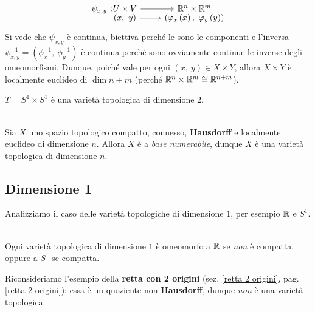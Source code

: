 \begin{demonstration}
\begin{enumerate}[label=\Roman*]
		\begin{equation*}
			\funztot{\psi_{x,y}}{U\times V}{\realset^n\times\realset^m}{\left(x,\ y\right)}{\left(\phi_x\left(x\right),\ \phi_y\left(y\right)\right)}
		\end{equation*}
	Si vede che $\psi_{x,y}$ è continua, biettiva perché le sono le componenti e l'inversa $\psi_{x,y}^{-1}=\left(\phi_x^{-1},\ \phi_y^{-1}\right)$ è continua perché sono ovviamente continue le inverse degli omeomorfismi. Dunque, poiché vale per ogni $\left(x,\ y\right)\in X\times Y$, allora $X\times Y$ è localmente euclideo di $\dim n+m$ (perché $\mathbb{R}^n\times \mathbb{R}^m\cong\mathbb{R}^{n+m}$).
	\end{enumerate}
\vspace{-3mm}
\end{demonstration}
\begin{example}
	$T=S^1\times S^1$ è una varietà topologica di dimensione $2$.
\end{example}
\begin{theorema}~{}\label{compattoconnessohausdorfflocalmenteuclideo}\\
Sia $X$ uno spazio topologico compatto, connesso, \textbf{Hausdorff} e localmente euclideo di dimensione $n$. Allora $X$ è a \textit{base numerabile}, dunque $X$ è una varietà topologica di dimensione $n$.
\end{theorema}
\subsection{Dimensione 1}
Analizziamo il caso delle varietà topologiche di dimensione $1$, per esempio $\mathbb{R}$ e $S^1$.
\begin{theorema}~{}\\
	Ogni varietà topologica di dimensione $1$ è omeomorfo a $\mathbb{R}$ se \textit{non} è compatta, oppure a $S^1$ se compatta.
\end{theorema}
\begin{example}\label{retta2originivarietà}
Riconsideriamo l'esempio della \textbf{retta con 2 origini} (sez. \ref{retta 2 origini}, pag. \ref{retta 2 origini}): essa è un quoziente non \textbf{Hausdorff}, dunque \textit{non} è una varietà topologica.
\end{example}
